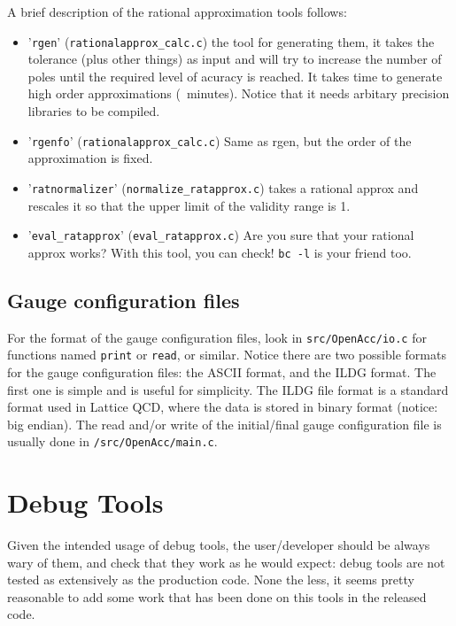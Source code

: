 A brief description of the rational approximation tools follows:
\begin{itemize}
    \item '\verb|rgen|' (\verb|rationalapprox_calc.c|) 
        the tool for generating them, it takes the tolerance (plus other
        things) as input and will try to increase the number of poles until
        the required level of acuracy is reached. It takes time to generate
        high order approximations (~minutes). Notice that it needs arbitary
        precision libraries to be compiled.
    \item '\verb|rgenfo|' (\verb|rationalapprox_calc.c|) 
        Same as rgen, but the order of the approximation is fixed.
    \item '\verb|ratnormalizer|' (\verb|normalize_ratapprox.c|) 
        takes a rational approx and
        rescales it so that the upper limit of the validity range is 1.
    \item '\verb|eval_ratapprox|' (\verb|eval_ratapprox.c|)
        Are you sure that your rational approx works? With this tool, you
        can check! \verb|bc -l| is your friend too.
\end{itemize}

\subsection{Gauge configuration files}
For the format of the gauge configuration files, look in 
\verb|src/OpenAcc/io.c|  for functions named \verb|print| or \verb|read|, or similar.
Notice there are two possible formats for the gauge configuration files: the 
ASCII format, and the ILDG format. The first one is simple and is useful for 
simplicity. The ILDG file format is a standard format used in Lattice QCD, 
where the data is stored in binary format (notice: big endian).  
The read and/or write of the initial/final gauge configuration file
is usually done in \verb|/src/OpenAcc/main.c|.


\section{Debug Tools}
Given the intended usage of debug tools, the user/developer should be always 
wary of them, and check that they work as he would expect: debug tools are not 
tested as extensively as the production code. None the less, it seems pretty
reasonable to add some work that has been done on this tools in the released 
code.
